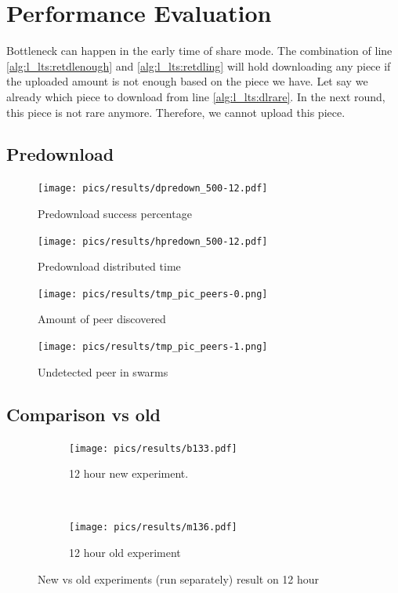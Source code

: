 \chapter{Performance Evaluation}
\label{chp:perfeval}

Bottleneck can happen in the early time of share mode. The combination of line \ref{alg:l_lts:retdlenough} and \ref{alg:l_lts:retdling} will hold downloading any piece if the uploaded amount is not enough based on the piece we have. Let say we already which piece to download from line \ref{alg:l_lts:dlrare}. In the next round, this piece is not rare anymore. Therefore, we cannot upload this piece. 

\section{Predownload}

\begin{figure}[h]
	\centering
	\texttt{[image: pics/results/dpredown\_500-12.pdf]}
	\caption{Predownload success percentage}
	\label{fig:predownprecent}
\end{figure}

\begin{figure}[h]
	\centering
	\texttt{[image: pics/results/hpredown\_500-12.pdf]}
	\caption{Predownload distributed time}
	\label{fig:predownhist}
\end{figure}

\begin{figure}[h]
	\centering
	\texttt{[image: pics/results/tmp\_pic\_peers-0.png]}
	\caption{Amount of peer discovered}
	\label{fig:peeramount}
\end{figure}

\begin{figure}[h]
	\centering
	\texttt{[image: pics/results/tmp\_pic\_peers-1.png]}
	\caption{Undetected peer in swarms}
	\label{fig:peer0}
\end{figure}

\section{Comparison vs old}
\begin{figure}[t!]
	\begin{adjustwidth}{-2.5cm}{}
		\begin{subfigure}[t]{0.7\textwidth}
			\centering
			\texttt{[image: pics/results/b133.pdf]}
			\caption{12 hour new experiment.}
		\end{subfigure}
		~
		\begin{subfigure}[t]{0.7\textwidth}
			\centering
			\texttt{[image: pics/results/m136.pdf]}
			\caption{12 hour old experiment}
		\end{subfigure}
		\caption{New vs old experiments (run separately) result on 12 hour}
	\end{adjustwidth}
\end{figure}

